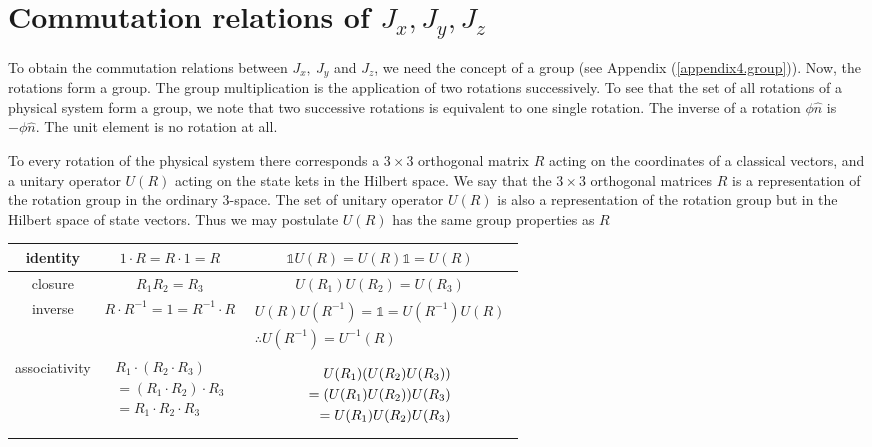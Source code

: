 \section{Commutation relations of \texorpdfstring{$J_x,J_y,J_z$}{PDFstring}}

To obtain the commutation relations between $J_x,\ J_y$ and $J_z$, we need the concept of a group (see Appendix (\ref{appendix4.group})). Now, the rotations form a group. The group multiplication is the application of two rotations successively. To see that the set of all rotations of a physical system form a group, we note that two successive rotations is equivalent to one single rotation. The inverse of a rotation $\phi \hat{n}$ is $-\phi\hat{n}$. The unit element is no rotation at all.



To every rotation of the physical system there corresponds a $3\times 3$ orthogonal matrix $R$ acting on the coordinates of a classical vectors, and a unitary operator $U(R)$ acting on the state kets in the Hilbert space. We say that the $3\times 3$ orthogonal matrices $R$ is a representation of the rotation group in the ordinary $3$-space. The set of unitary operator $U(R)$ is also a representation of the rotation group but in the Hilbert space of state vectors. Thus we may postulate $U(R)$ has the same group properties as $R$

\begin{table}
	\begin{tabular}{|c|c|c|}
		identity & $1\cdot R = R\cdot 1 = R$ & $\mathbb{1} U(R) = U(R) \mathbb{1} = U(R)$ \\ \hline
		closure & $R_1 R_2 = R_3$ & $U(R_1) U(R_2) = U(R_3)$ \\ \hline
		inverse & $R \cdot R^{-1} = 1 = R^{-1}\cdot R$ & 
			\begin{minipage}{5cm}
				\begin{align*}
				U(R) U(R^{-1}) = \mathbb{1} =  U(R^{-1})  U(R)\\
				\therefore  U(R^{-1}) =  U^{-1}(R) 
				\end{align*}
			\end{minipage}\\ \hline
		associativity & 
		\begin{minipage}{5cm}
			\begin{align*}
			R_1 \cdot (R_2 \cdot R_3) \\
			= (R_1 \cdot R_2) \cdot R_3 \\
			= R_1 \cdot R_2 \cdot R_3
			\end{align*}
		\end{minipage}
			 & 
		\begin{minipage}{5cm}
			\begin{align*}
			U(R_1)\qty(U(R_2) U(R_3)) \\
			= \qty(U(R_1)U(R_2)) U(R_3)\\
			= U(R_1)U(R_2) U(R_3)
			\end{align*}
		\end{minipage}
	\end{tabular}
\end{table}

